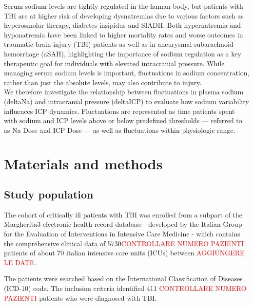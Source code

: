 Serum sodium levels are tightly regulated in the human body, but patients with TBI are at higher risk of developing dysnatremias due to various factors such as hyperosmolar therapy, diabetes insipidus and SIADH. Both hypernatremia\cite{maggioreRelationIncidenceHypernatremia2009a}\cite{vedantamMorbidityMortalityAssociated2017a} and hyponatremia \cite{yumotoPrevalenceRiskFactors2015a} have been linked to higher mortality rates and worse outcomes in traumatic brain injury (TBI) patients as well as in aneurysmal subarachnoid hemorrhage (aSAH)\cite{labibSodiumItsImpact2024}\cite{balesEffectHyponatremiaSodium2016}, highlighting the importance of sodium regulation as a key therapeutic goal for individuals with elevated intracranial pressure. While managing serum sodium levels is important, fluctuations in sodium concentration, rather than just the absolute levels, may also  contribute to injury.\\

We therefore investigate the relationship between fluctuations in plasma sodium (deltaNa) and intracranial pressure (deltaICP) to evaluate how sodium variability influences ICP dynamics. Fluctuations are represented as time patients spent with sodium and ICP levels above or below predefined thresholds — referred to as Na Dose and ICP Dose — as well as  fluctuations within physiologic range.\\

\section {Materials and methods}
\subsection{Study population}
The cohort of critically ill patients with TBI was enrolled from a subpart of the Margherita3 electronic health record database - developed by the Italian Group for the Evaluation of Interventions in Intensive Care Medicine\cite{finazziDataCollectionResearch2018} - which contains the comprehensive clinical data of 5730\textcolor{red}{CONTROLLARE NUMERO PAZIENTI} patients of about 70 italian intensive care units (ICUs) between \textcolor{red}{AGGIUNGERE LE DATE}. 

The patients were searched based on the International Classification of Diseases (ICD-10) code. The inclusion criteria identified 411 \textcolor{red}{CONTROLLARE NUMERO PAZIENTI} patients who were diagnosed with TBI.

